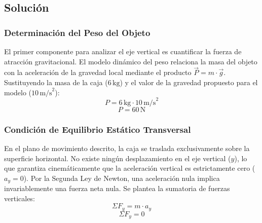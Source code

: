 \documentclass[12pt]{article}
\begin{document}
\begin{center}
\end{center}

\subsection*{Solución}

\subsubsection*{Determinación del Peso del Objeto}
El primer componente para analizar el eje vertical es cuantificar la fuerza de atracción gravitacional. El modelo dinámico del peso relaciona la masa del objeto con la aceleración de la gravedad local mediante el producto $\vec{P} = m \cdot \vec{g}$. Sustituyendo la masa de la caja ($6 \, \text{kg}$) y el valor de la gravedad propuesto para el modelo ($10 \, \text{m/s}^2$):
\begin{equation}
    P = 6 \, \text{kg} \cdot 10 \, \text{m/s}^2
\end{equation}
\begin{equation}
    P = 60 \, \text{N}
\end{equation}

\subsubsection*{Condición de Equilibrio Estático Transversal}
En el plano de movimiento descrito, la caja se traslada exclusivamente sobre la superficie horizontal. No existe ningún desplazamiento en el eje vertical ($y$), lo que garantiza cinemáticamente que la aceleración vertical es estrictamente cero ($a_y = 0$). 
Por la Segunda Ley de Newton, una aceleración nula implica invariablemente una fuerza neta nula. Se plantea la sumatoria de fuerzas verticales:
\begin{equation}
    \Sigma F_y = m \cdot a_y
\end{equation}
\begin{equation}
    \Sigma F_y = 0
\end{equation}
\end{document}
